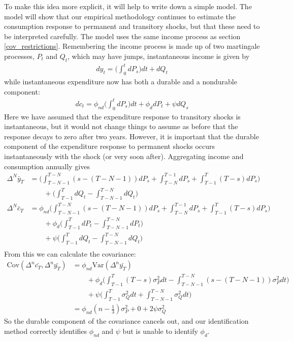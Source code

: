 \documentclass[titlepage]{\econtex}\newcommand{\texname}{ConsumptionHeterogeneity}
\begin{document}
To make this idea more explicit, it will help to write down a simple model. The model will show that our empirical methodology continues to estimate the consumption response to permanent and transitory shocks, but that these need to be interpreted carefully. The model uses the same income process as section \ref{cov_restrictions}. Remembering the income process is made up of two martingale processes, $P_t$ and $Q_t$, which may have jumps, instantaneous income is given by
\begin{align*}
dy_t = \Big( \int_{0}^{t}dP_s \Big) dt  +dQ_t 
\end{align*}
while instantaneous expenditure now has both a durable and a nondurable component:
\begin{align*}
dc_t = \phi_{nd} \Big( \int_{0}^{t} dP_s  \Big) dt + \phi_{d} dP_t + \psi dQ_s
\end{align*}
Here we have assumed that the expenditure response to transitory shocks is instantaneous, but it would not change things to assume as before that the response decays to zero after two years. However, it is important that the durable component of the expenditure response to permanent shocks occurs instantaneously with the shock (or very soon after). Aggregating income and consumption annually gives
\begin{align*}
\Delta^N \bar{y}_T &=  \Big(\int_{T-N-1}^{T-N} (s-(T-N-1))dP_s  + \int_{T-N}^{T-1}dP_s + \int_{T-1}^{T} (T-s)dP_s \Big) \\
& \qquad + \Big(\int_{T-1}^{T} dQ_t -\int_{T-N-1}^{T-N} dQ_t \Big) \\
\Delta^N \bar{c}_T &= \phi_{nd} \Big(\int_{T-N-1}^{T-N} (s-(T-N-1))dP_s  + \int_{T-N}^{T-1}dP_s + \int_{T-1}^{T} (T-s)dP_s \Big) \\
& \qquad + \phi_d \Big(\int_{T-1}^{T} dP_t -\int_{T-N-1}^{T-N} dP_t \Big) \\
& \qquad + \psi \Big(\int_{T-1}^{T} dQ_t -\int_{T-N-1}^{T-N} dQ_t \Big) \\
\end{align*}
From this we can calculate the covariance:
\begin{align*}
\mathrm{Cov}(\Delta^n \bar{c_T},\Delta^n \bar{y_T} ) &= \phi_{nd} \mathrm{Var}(\Delta^n \bar{y_T}) \\
& \qquad + \phi_d \Bigg( \int_{T-1}^{T} (T-s) \sigma_P^2 dt - \int_{T-N-1}^{T-N}(s-(T-N-1)) \sigma_P^2 dt \Bigg) \\
& \qquad + \psi\Bigg(\int_{T-1}^{T}  \sigma_Q^2 dt + \int_{T-N-1}^{T-N}\sigma_Q^2 dt\Bigg) \\
&= \phi_{nd} (n-\frac{1}{3})\sigma_P^2 + 0 +  2 \psi \sigma_Q^2
\end{align*}
So the durable component of the covariance cancels out, and our identification method correctly identifies $\phi_{nd}$ and $\psi$ but is unable to identify $\phi_d$.
\end{document}
